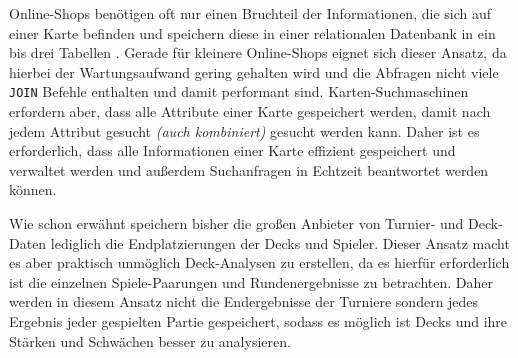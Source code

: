 Online-Shops benötigen oft nur einen Bruchteil der Informationen, die sich auf einer Karte befinden und speichern diese in einer relationalen Datenbank in ein bis drei Tabellen \cite{johnson2013online}. Gerade für kleinere Online-Shops eignet sich dieser Ansatz, da hierbei der Wartungsaufwand gering gehalten wird \cite{johnson2013online} und die Abfragen nicht viele \verb|JOIN| Befehle enthalten und damit performant sind. Karten-Suchmaschinen erfordern aber, dass alle Attribute einer Karte gespeichert werden, damit nach jedem Attribut gesucht \emph{(auch kombiniert)} gesucht werden kann. Daher ist es erforderlich, dass alle Informationen einer Karte effizient gespeichert und verwaltet werden und außerdem Suchanfragen in Echtzeit beantwortet werden können.

Wie schon erwähnt speichern bisher die großen Anbieter von Turnier- und Deck-Daten lediglich die Endplatzierungen der Decks und Spieler. Dieser Ansatz macht es aber praktisch unmöglich Deck-Analysen zu erstellen, da es hierfür erforderlich ist die einzelnen Spiele-Paarungen und Rundenergebnisse zu betrachten. Daher werden in diesem Ansatz nicht die Endergebnisse der Turniere sondern jedes Ergebnis jeder gespielten Partie gespeichert, sodass es möglich ist Decks und ihre Stärken und Schwächen besser zu analysieren.




